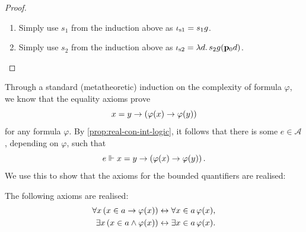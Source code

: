 \documentclass[12pt,openany]{book}
\theoremstyle{plain}
\theoremstyle{definition}
\newcommand\uplabel[1]{\textup{(#1)}}
\newcommand\opA[1]{\mathop{\forall #1}}
\newcommand\opE[1]{\mathop{\exists #1}}
\newcommand\oplam[1]{\mathop{\lambda #1.}}
\newcommand\bp{\mathbf{p}}
\newcommand\br{\mathbf{r}}
\newcommand\iot{\iota_\textup{t}}
\newcommand\ioso{\iota_\textup{s1}}
\newcommand\iost{\iota_\textup{s2}}
\begin{document}
\begin{proof}
\begin{enumerate}[label=\uplabel{\roman*}]
\begin{align*}
            s_2 g & \Vdash y \subseteq z \rightarrow \left(x \in y \rightarrow x \in z\right),             \\
            tg    & \Vdash x \subseteq y \rightarrow \left(y \subseteq z \rightarrow x \subseteq z\right), \\
            pg    & \Vdash x = y \rightarrow \left(y = z \rightarrow x = z\right),                         \\
            s_1 g & \Vdash x = y \rightarrow \left(y \in z \rightarrow x \in z\right).
          \end{align*}
          Thus, by recursion, if we take $g = \oplam{de} \br \mleft(\oplam{ah} s_1 h \mleft(\bp_0 a\mright) \mleft(\bp_1 a\mright)\mright) \mleft(\bp de\mright)$, then we can see that $g, s_2 g, tg, pg, s_1 g$ realise their corresponding formulae for all $x, y, z \in V\mleft(\mathcal{A}\mright)$ by set induction on $y$. It suffices now to take $\iot = pg$.
    \item Simply use $s_1$ from the induction above as $\ioso = s_1 g$.
    \item Simply use $s_2$ from the induction above as $\iost = \oplam{d} s_2 g \mleft(\bp_0 d\mright)$. \qedhere
  \end{enumerate}
\end{proof}

Through a standard (metatheoretic) induction on the complexity of formula $\varphi$, we know that the equality axioms prove
\[x = y \rightarrow \left(\varphi\mleft(x\mright) \rightarrow \varphi\mleft(y\mright)\right)\]
for any formula $\varphi$. By \autoref{prop:real-con-int-logic}, it follows that there is some $e \in \mathcal{A}$, depending on $\varphi$, such that
\[e \Vdash x = y \rightarrow \left(\varphi\mleft(x\mright) \rightarrow \varphi\mleft(y\mright)\right).\]
We use this to show that the axioms for the bounded quantifiers are realised:
\begin{lemma}
  \label{lem:set-bnd-quant-axioms-real}
  The following axioms are realised:
  \begin{align*}
    \opA{x} \left(x \in a \rightarrow \varphi\mleft(x\mright)\right) & \leftrightarrow \opA{x \in a} \varphi\mleft(x\mright), \\
    \opE{x} \left(x \in a \land \varphi\mleft(x\mright)\right)       & \leftrightarrow \opE{x \in a} \varphi\mleft(x\mright).
  \end{align*}
\end{lemma}
\end{document}
